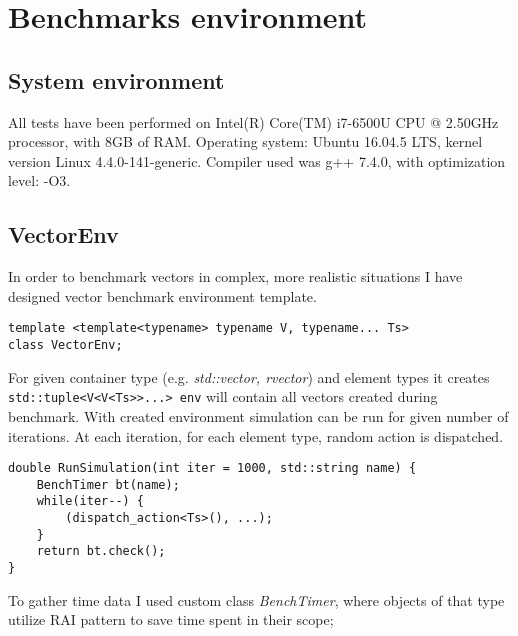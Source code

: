 \documentclass[inz, english, shortabstract]{iithesis}
\begin{document}
\chapter{Benchmarks environment}
\section{System environment}
All tests have been performed on Intel(R) Core(TM) i7-6500U CPU @ 2.50GHz processor, with 8GB of RAM. Operating system: Ubuntu 16.04.5 LTS, kernel version Linux 4.4.0-141-generic. Compiler used was g++ 7.4.0, with optimization level: -O3.
\section{VectorEnv}
In order to benchmark vectors in complex, more realistic situations I have designed vector benchmark environment template.

\begin{lstlisting}[caption=VectorEnv declaration]
template <template<typename> typename V, typename... Ts>
class VectorEnv;
\end{lstlisting}
For given container type (e.g. {\it std::vector, rvector}) and element types it creates 
\lstinline{std::tuple<V<V<Ts>>...> env}
will contain all vectors created during benchmark. 
With created environment simulation can be run for given number of iterations.
At each iteration, for each element type, random action is dispatched.
\begin{lstlisting}[caption=RunSimulation]
double RunSimulation(int iter = 1000, std::string name) {
	BenchTimer bt(name);
	while(iter--) {
		(dispatch_action<Ts>(), ...);
	}
	return bt.check();
}
\end{lstlisting}
To gather time data I used custom class {\it BenchTimer}, where objects of that type utilize RAI pattern to save time spent in their scope;

\clearpage
\end{document}
